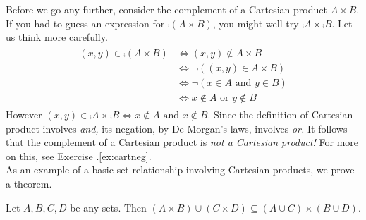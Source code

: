 Before we go any further, consider the complement of a Cartesian product $A\times B$. If you had to guess an expression for $\comp{(A\times B)}$, you might well try $\comp A\times\comp B$. Let us think more carefully.
\begin{gather*}
\begin{aligned}
(x,y)\in\comp{(A\times B)}&\iff (x,y)\not\in A\times B\\
&\iff \neg((x,y)\in A\times B)\\
&\iff \neg(x\in A\text{ and }y\in B)\\
&\iff x\not\in A\text{ or }y\not\in B
\end{aligned}
\end{gather*}
However $(x,y)\in\comp A\times\comp B\iff x\not\in A\text{ and }x\not\in B$. Since the definition of Cartesian product involves \emph{and,} its negation, by De Morgan's laws, involves \emph{or.} It follows that the complement of a Cartesian product is \emph{not a Cartesian product!} For more on this, see Exercise \hyperref[ex:cartneg]{\thesubsection.\ref*{ex:cartneg}}.\\


As an example of a basic set relationship involving Cartesian products, we prove a theorem.

\begin{thm}\label{thm:cartex}
Let $A,B,C,D$ be any sets. Then $(A\times B)\cup(C\times D)\subseteq(A\cup C)\times(B\cup D)$.
\end{thm}

